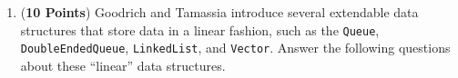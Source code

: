 \documentclass[12pt]{article}
\begin{document}
\begin{enumerate}







\item ({\bf 10 Points}) Goodrich and Tamassia introduce several extendable data structures that store data in a linear
fashion, such as the {\tt Queue}, {\tt DoubleEndedQueue}, {\tt LinkedList}, and {\tt Vector}. Answer the following
questions about these ``linear'' data structures.


\end{enumerate}
\end{document}
